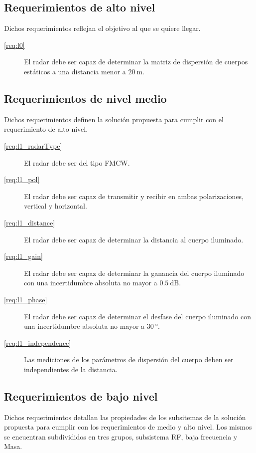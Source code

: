 \subsection{Requerimientos de alto nivel}

Dichos requerimientos reflejan el objetivo al que se quiere llegar.
\begin{description}
  \item[\ref{req:l0}] El radar debe ser capaz de determinar la matriz de dispersión de cuerpos estáticos a una distancia menor a $\SI{20}{\meter}$.
\end{description}


\subsection{Requerimientos de nivel medio}

Dichos requerimientos definen la solución propuesta para cumplir con el requerimiento de alto nivel.

\begin{description}
  \item[\ref{req:l1_radarType}] El radar debe ser del tipo FMCW.
  \item[\ref{req:l1_pol}] El radar debe ser capaz de transmitir y recibir en ambas polarizaciones, vertical y horizontal.
  \item[\ref{req:l1_distance}] El radar debe ser capaz de determinar la distancia al cuerpo iluminado.
  \item[\ref{req:l1_gain}] El radar debe ser capaz de determinar la ganancia del cuerpo iluminado con una incertidumbre absoluta no mayor a $\SI{0.5}{\dB}$.
  \item[\ref{req:l1_phase}] El radar debe ser capaz de determinar el desfase del cuerpo iluminado con una incertidumbre absoluta no mayor a $\SI{30}{\degree}$.
  \item[\ref{req:l1_independence}] Las mediciones de los parámetros de dispersión del cuerpo deben ser independientes de la distancia.
\end{description}


\subsection{Requerimientos de bajo nivel}

Dichos requerimientos detallan las propiedades de los subsitemas de la solución propuesta para cumplir con los requerimientos de medio y alto nivel. Los mismos se encuentran subdivididos en tres grupos, subsistema RF, baja frecuencia y Masa.

